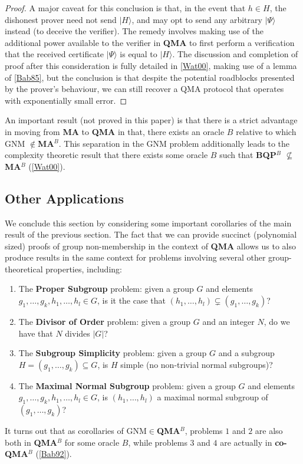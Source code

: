 \documentclass[12pt]{article}
\numberwithin{thm}{section}
\numberwithin{defn}{section}
\numberwithin{prop}{section}
\numberwithin{rmk}{section}
\newcommand{\ket}[1]{\vert #1 \rangle}
\begin{document}
\begin{proof}
		A major caveat for this conclusion is that, in the event that $h\in H$, the dishonest prover need not send $\ket{H}$, and may opt to send any arbitrary $\ket{\Psi}$ instead (to deceive the verifier). The remedy involves making use of the additional power available to the verifier in \textbf{QMA} to first perform a verification that the received certificate $\ket{\Psi}$ is equal to $\ket{H}$. The discussion and completion of proof after this consideration is fully detailed in \hyperref[wat00]{[Wat00]}, making use of a lemma of \hyperref[bab85]{[Bab85]}, but the conclusion is that despite the potential roadblocks presented by the prover's behaviour, we can still recover a QMA protocol that operates with exponentially small error.
	\end{proof}
	An important result (not proved in this paper) is that there is a strict advantage in moving from \textbf{MA} to \textbf{QMA} in that, there exists an oracle $B$ relative to which GNM $\notin$\textbf{MA$^B$}. This separation in the GNM problem additionally leads to the complexity theoretic result that there exists some oracle $B$ such that \textbf{BQP$^B$} $\not\subseteq$ \textbf{MA$^B$} (\hyperref[wat00]{[Wat00]}).  
    \subsection{Other Applications}
    We conclude this section by considering some important corollaries of the main result of the previous section. The fact that we can provide succinct (polynomial sized) proofs of group non-membership in the context of \textbf{QMA} allows us to also produce results in the same context for problems involving several other group-theoretical properties, including:
    \begin{enumerate}
    	\item The \textbf{Proper Subgroup} problem: given a group $G$ and elements $g_1,\dots,g_k,h_1,\dots,h_l\in G$, is it the case that $(h_1,\dots,h_l)\subsetneq (g_1,\dots,g_k)$?
    	\item The \textbf{Divisor of Order} problem: given a group $G$ and an integer $N$, do we have that $N$ divides $|G|$?
    	\item The \textbf{Subgroup Simplicity} problem: given a group $G$ and a subgroup $H=(g_1,\dots,g_k)\subseteq G$, is $H$ simple (no non-trivial normal subgroups)?
    	\item  The \textbf{Maximal Normal Subgroup} problem: given a group $G$ and elements $g_1,\dots,g_k,h_1,\dots,h_l\in G$, is $(h_1,\dots,h_l)$ a maximal normal subgroup of $(g_1,\dots,g_k)$? 
    \end{enumerate}
	It turns out that as corollaries of GNM$\in$\textbf{QMA$^B$}, problems $1$ and $2$ are also both in \textbf{QMA$^B$} for some oracle $B$, while problems $3$ and $4$ are actually in \textbf{co-QMA$^B$}  (\hyperref[bab92]{[Bab92]}).
	
\end{document}
